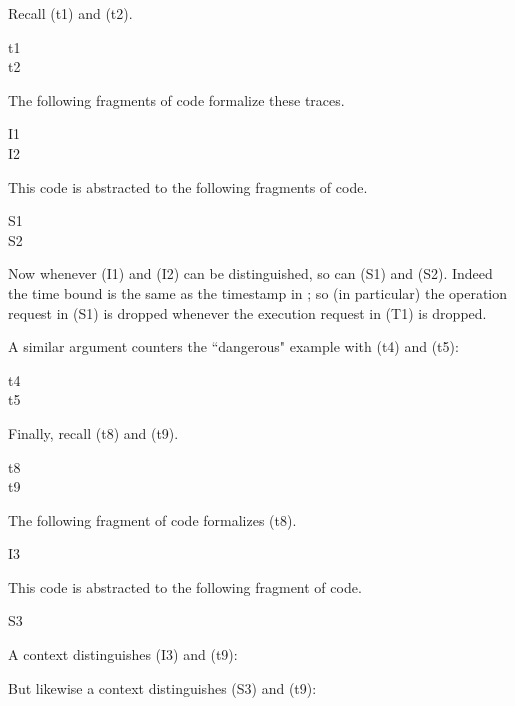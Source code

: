 \documentclass[10pt]{article}
\begin{document}
Recall (t1) and (t2).
\begin{description}
\item[t1] 
\item[t2] 
\end{description}
The following fragments of  code formalize these traces.
\begin{description}
\item[I1] 
\item[I2] 
\end{description}
This code is abstracted to the following fragments of  code.
\begin{description}
\item[S1] 
\item[S2] 
\end{description}
Now whenever (I1) and (I2) can be distinguished, so can (S1) and (S2). Indeed the time bound  is the same as the timestamp in ; so (in particular) the operation request in (S1) is dropped whenever the execution request in (T1) is dropped.

A similar argument counters the ``dangerous" example with (t4) and (t5):
\begin{description}
\item[t4] 
\item[t5] 
\end{description}

Finally, recall (t8) and (t9).
\begin{description}
\item[t8] 
\item[t9] 
\end{description}
The following fragment of  code formalizes (t8).
\begin{description}
\item[I3] 
\par 
\end{description}
This code is abstracted to the following fragment of  code.
\begin{description}
\item[S3] 
\par 
\end{description}
A  context distinguishes (I3) and (t9):
\begin{description}
\item 
\par 
\end{description}
But likewise a  context distinguishes (S3) and (t9):
\begin{description}
\item 
\par 
\end{description}
\end{document}
